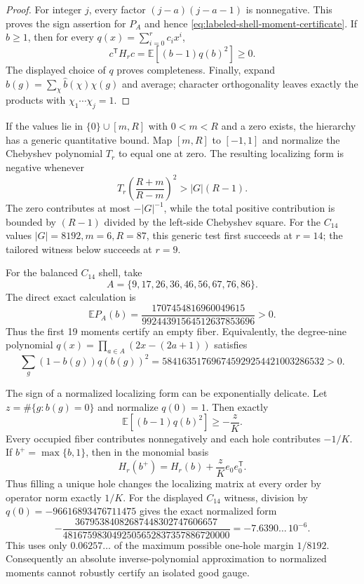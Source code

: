\documentclass[11pt]{article}
\newcommand{\E}{\mathbb E}
\begin{document}
\begin{proof}
For integer $j$, every factor $(j-a)(j-a-1)$ is nonnegative.  This proves
the sign assertion for $P_A$ and hence
\eqref{eq:labeled-shell-moment-certificate}.  If $b\ge1$, then for every
$q(x)=\sum_{i=0}^r c_ix^i$,
\[
 c^{\mathsf T}H_rc=\E[(b-1)q(b)^2]\ge0.
\]
The displayed choice of $q$ proves completeness.  Finally, expand
$b(g)=\sum_\chi\widehat b(\chi)\chi(g)$ and average; character orthogonality
leaves exactly the products with $\chi_1\cdots\chi_j=1$.
\end{proof}

If the values lie in $\{0\}\cup[m,R]$ with $0<m<R$ and a zero exists, the
hierarchy has a generic quantitative bound.  Map $[m,R]$ to $[-1,1]$ and normalize the
Chebyshev polynomial $T_r$ to equal one at zero.  The resulting localizing
form is negative whenever
\[
 T_r\!\left(\frac{R+m}{R-m}\right)^2>|G|(R-1).
\]
The zero contributes at most $-|G|^{-1}$, while the total positive
contribution is bounded by $(R-1)$ divided by the left-side Chebyshev square.
For the $C_{14}$ values $|G|=8192,m=6,R=87$, this generic test first succeeds
at $r=14$; the tailored witness below succeeds at $r=9$.

For the balanced $C_{14}$ shell, take
\[
 A=\{9,17,26,36,46,56,67,76,86\}.
\]
The direct exact calculation is
\begin{equation}
 \E P_A(b)=
 \frac{1707454816960049615}{99244391564512637853696}>0.
 \label{eq:c14-moment-certificate}
\end{equation}
Thus the first 19 moments certify an empty fiber.  Equivalently, the
degree-nine polynomial $q(x)=\prod_{a\in A}(2x-(2a+1))$ satisfies
\[
 \sum_g(1-b(g))q(b(g))^2
 =584163517696745929254421003286532>0.
\]

The sign of a normalized localizing form can be exponentially delicate.
Let $z=\#\{g:b(g)=0\}$ and normalize $q(0)=1$.  Then exactly
\begin{equation}
 \E[(b-1)q(b)^2]\ge-\frac zK.                         \label{eq:hole-margin}
\end{equation}
Every occupied fiber contributes nonnegatively and each hole contributes
$-1/K$.  If $b^+=\max\{b,1\}$, then in the monomial basis
\begin{equation}
 H_r(b^+)=H_r(b)+\frac zK e_0e_0^{\mathsf T}.          \label{eq:fill-one}
\end{equation}
Thus filling a unique hole changes the localizing matrix at every order by
operator norm exactly $1/K$.  For the displayed $C_{14}$ witness, division by
$q(0)=-96616893476711475$ gives the exact normalized form
\[
 -\frac{36795384082687448302747606657}
 {4816759830492505652837357886720000}
 =-7.6390\ldots\,10^{-6}.
\]
This uses only $0.06257\ldots$ of the maximum possible one-hole margin
$1/8192$.  Consequently an absolute inverse-polynomial approximation to
normalized moments cannot robustly certify an isolated good gauge.
\end{document}
